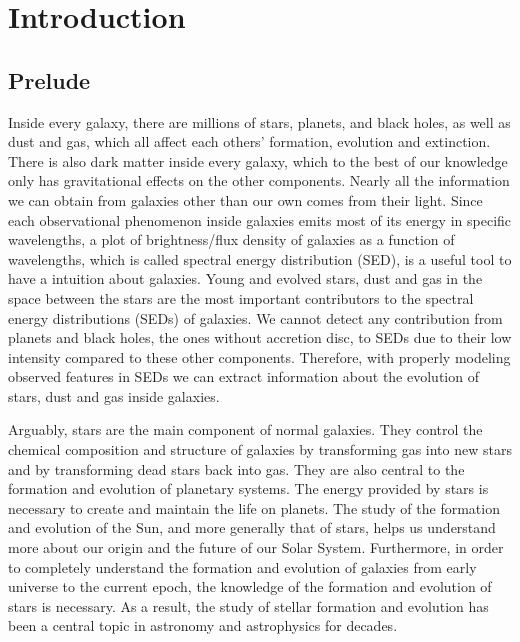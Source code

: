 \chapter{Introduction}
\label{chap:intro}

\section{Prelude}
\label{sec: overview}
Inside every galaxy, there are millions of stars, planets, and black holes, as well as dust and gas, which all affect each others' formation, evolution and extinction.
There is also dark matter inside every galaxy, which to the best of our knowledge only has gravitational effects on the other components.
Nearly all the information we can obtain from galaxies other than our own comes from their light.
Since each observational phenomenon inside galaxies emits most of its energy in specific wavelengths, 
a plot of brightness/flux density of galaxies as a function of wavelengths, which is called spectral energy distribution (SED), is a useful tool to have a intuition about galaxies. 
Young and evolved stars, dust and gas in the space between the stars are the most important contributors to the spectral energy distributions (SEDs) of galaxies.
We cannot detect any contribution from planets and black holes, the ones without accretion disc, to SEDs due to their low intensity compared to these other components.
Therefore, with properly modeling observed features in SEDs we can extract information about the evolution of stars, dust and gas inside galaxies.

Arguably, stars are the main component of normal galaxies.
They control the chemical composition and structure of galaxies by transforming gas into new stars and by transforming dead stars back into gas.
They are also central to the formation and evolution of planetary systems.
The energy provided by stars is necessary to create and maintain the life on planets. 
The study of the formation and evolution of the Sun, and more generally that of stars, helps us understand more about our origin and the future of our Solar System.
Furthermore, in order to completely understand the formation and evolution of galaxies from early universe to the current epoch, the knowledge of the formation and evolution of stars is necessary. 
As a result, the study of stellar formation and evolution has been a central topic in astronomy and astrophysics for decades.

